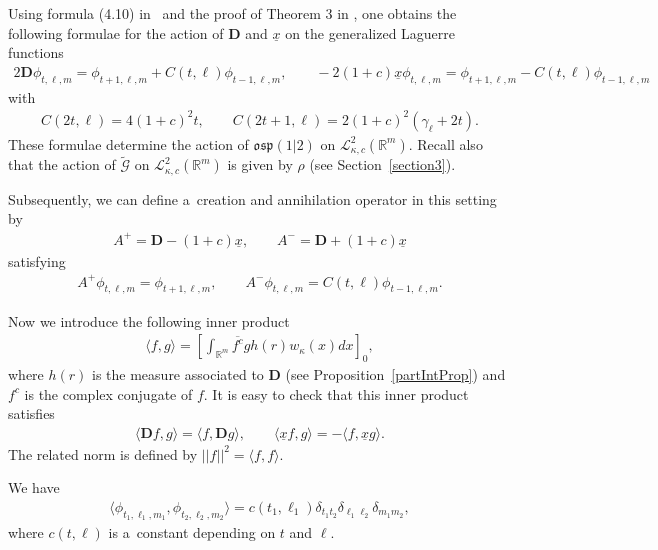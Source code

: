 \documentclass[pdftex]{sigma}
\numberwithin{equation}{section}
\numberwithin{theorem}{section}
\numberwithin{proposition}{section}
\numberwithin{lemma}{section}
\numberwithin{corollary}{section}
\numberwithin{definition}{section}
\numberwithin{example}{section}
\numberwithin{remark}{section}
\numberwithin{note}{section}
\theoremstyle{remark}
\newcommand{\mR}{\mathbb{R}}
\newcommand{\cG}{\mathcal{G}}
\newcommand{\cL}{\mathcal{L}}
\newcommand{\dD}{\textbf{D}}
\newcommand{\ux}{\underline{x}}
\def\k{{\kappa}}
\def\la{{\langle}}
\def\ra{{\rangle}}
\begin{document}
Using formula (4.10) in~\cite{H12} and the proof of Theorem 3 in \cite{H12}, one obtains the
following formulae for the action of $\dD$ and $\ux$ on the generalized Laguerre functions
\begin{gather}
2 \dD \phi_{t,\ell,m}\! = \phi_{t+1,\ell,m}\! + C(t,\ell) \phi_{t-1,\ell,m},\qquad
-2(1+c) \ux \phi_{t,\ell,m}\! = \phi_{t+1,\ell,m}\! - C(t,\ell) \phi_{t-1,\ell,m}\!\!\!\!\label{ActionOnBasis}
\end{gather}
with
\begin{gather*}
C(2t, \ell)= 4 (1+c)^{2} t,\qquad
C(2t+1, \ell)= 2 (1+c)^{2}(\gamma_{\ell}+ 2t).
\end{gather*}
These formulae determine the action of $\mathfrak{osp}(1|2)$ on $\cL^{2}_{\k,c}(\mR^{m})$.
Recall also that the action of $\widetilde{\cG}$ on $\cL^{2}_{\k,c}(\mR^{m})$ is given by $\rho$
(see Section~\ref{section3}).

Subsequently, we can def\/ine a~creation and annihilation operator in this setting by
\begin{gather}\label{CreaAnn}
A^{+} = \dD - (1+c) \ux,\qquad
A^{-} = \dD + (1+c) \ux
\end{gather}
satisfying
\begin{gather*}%
A^{+} \phi_{t,\ell,m} = \phi_{t+1,\ell,m},\qquad
A^{-} \phi_{t,\ell,m} = C(t, \ell) \phi_{t-1,\ell,m}.
\end{gather*}

Now we introduce the following inner product
\begin{gather*}
\langle f,g\rangle=\left[\int_{\mR^{m}}\overline{f^{c}}g h(r)w_{\k}(x)dx\right]_{0},
\end{gather*}
where $h(r)$ is the measure associated to $\dD$ (see Proposition~\ref{partIntProp}) and $f^{c}$ is
the complex conjugate of $f$.
It is easy to check that this inner product satisf\/ies
\begin{gather}\label{adjointsIP}
\langle \dD f, g \rangle = \la f, \dD g\ra,\qquad
\la \ux f, g \ra = -\la f, \ux g \ra.
\end{gather}
The related norm is def\/ined by $||f||^{2}=\la f,f\ra$.

\begin{theorem}%
We have
\begin{gather*}
\langle\phi_{t_{1},\ell_{1},m_{1}},\phi_{t_{2},\ell_{2},m_{2}}\rangle=c(t_{1},\ell_{1})
\delta_{t_{1}t_{2}}\delta_{\ell_{1}\ell_{2}}\delta_{m_{1}m_{2}},
\end{gather*}
where $c(t,\ell)$ is a~constant depending on $t$ and $\ell$.
\end{theorem}
\end{document}
